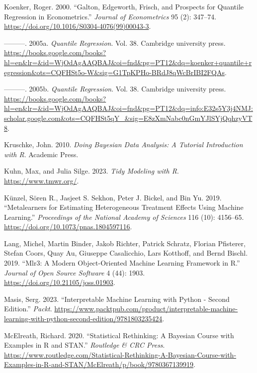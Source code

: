 \documentclass[
  letterpaper,
]{krantz}
\newlength{\cslhangindent}
\newenvironment{CSLReferences}[2] %
 {\begin{list}{}{%
  \setlength{\itemindent}{0pt}
  \setlength{\leftmargin}{0pt}
  \setlength{\parsep}{0pt}
  \ifodd #1
   \setlength{\leftmargin}{\cslhangindent}
   \setlength{\itemindent}{-1\cslhangindent}
  \fi
  \setlength{\itemsep}{#2\baselineskip}}}
 {\end{list}}
\begin{document}
\begin{CSLReferences}{1}{0}
Koenker, Roger. 2000. {``Galton, {Edgeworth}, {Frisch}, and Prospects
for Quantile Regression in Econometrics.''} \emph{Journal of
Econometrics} 95 (2): 347--74.
\url{https://doi.org/10.1016/S0304-4076(99)00043-3}.

---------. 2005a. \emph{Quantile Regression}. Vol. 38. Cambridge
university press.
\url{https://books.google.com/books?hl=en&lr=&id=WjOdAgAAQBAJ&oi=fnd&pg=PT12&dq=koenker+quantile+regression&ots=CQFHSt5o-W&sig=G1TpKPHo-BRdJ8qWcBrIBI2FQAs}.

---------. 2005b. \emph{Quantile Regression}. Vol. 38. Cambridge
university press.
\url{https://books.google.com/books?hl=en&lr=&id=WjOdAgAAQBAJ&oi=fnd&pg=PT12&dq=info:E32s5Y3j4NMJ:scholar.google.com&ots=CQFHSt5qY_&sig=E8zXmNabc0nGmYJlSYjQqhzyVT8}.

Kruschke, John. 2010. \emph{Doing {Bayesian} {Data} {Analysis}: {A}
{Tutorial} {Introduction} with {R}}. Academic Press.

Kuhn, Max, and Julia Silge. 2023. \emph{Tidy {Modeling} with {R}}.
\url{https://www.tmwr.org/}.

Künzel, Sören R., Jasjeet S. Sekhon, Peter J. Bickel, and Bin Yu. 2019.
{``Metalearners for Estimating Heterogeneous Treatment Effects Using
Machine Learning.''} \emph{Proceedings of the National Academy of
Sciences} 116 (10): 4156--65.
\url{https://doi.org/10.1073/pnas.1804597116}.

Lang, Michel, Martin Binder, Jakob Richter, Patrick Schratz, Florian
Pfisterer, Stefan Coors, Quay Au, Giuseppe Casalicchio, Lars Kotthoff,
and Bernd Bischl. 2019. {``Mlr3: {A} Modern Object-Oriented Machine
Learning Framework in {R}.''} \emph{Journal of Open Source Software} 4
(44): 1903. \url{https://doi.org/10.21105/joss.01903}.

Masis, Serg. 2023. {``Interpretable {Machine} {Learning} with {Python} -
{Second} {Edition}.''} \emph{Packt}.
\url{https://www.packtpub.com/product/interpretable-machine-learning-with-python-second-edition/9781803235424}.

McElreath, Richard. 2020. {``Statistical {Rethinking}: {A} {Bayesian}
{Course} with {Examples} in {R} and {STAN}.''} \emph{Routledge \& CRC
Press}.
\url{https://www.routledge.com/Statistical-Rethinking-A-Bayesian-Course-with-Examples-in-R-and-STAN/McElreath/p/book/9780367139919}.


\end{CSLReferences}
\end{document}
